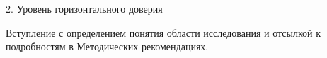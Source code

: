 \begin{frame}{2. Уровень горизонтального доверия}

\tiny
Вступление с определением понятия области исследования и отсылкой к подробностям в Методических рекомендациях.

\end{frame}


